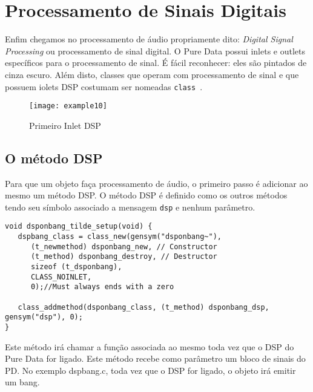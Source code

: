 
\chapter{Processamento de Sinais Digitais}

Enfim chegamos no processamento de áudio propriamente dito: \emph{Digital
Signal Processing} ou processamento de sinal digital.
O Pure Data possui inlets e outlets específicos para o processamento de sinal.
É fácil reconhecer: eles são pintados de cinza escuro.
Além disto, classes que operam com processamento de sinal e que possuem iolets
DSP costumam ser nomeadas \texttt{class~}.

\begin{figure}[h!]
\centering
\texttt{[image: example10]}
\caption{Primeiro Inlet DSP}
\end{figure}

\section{O método DSP}

Para que um objeto faça processamento de áudio, o primeiro passo é adicionar ao
mesmo um método DSP.
O método DSP é definido como os outros métodos tendo seu símbolo associado a
mensagem \texttt{dsp} e nenhum parâmetro.

\begin{lstlisting}[caption=Adicionando um método para DSP]
void dsponbang_tilde_setup(void) {
   dspbang_class = class_new(gensym("dsponbang~"),
      (t_newmethod) dsponbang_new, // Constructor
      (t_method) dsponbang_destroy, // Destructor
      sizeof (t_dsponbang),
      CLASS_NOINLET,
      0);//Must always ends with a zero

   class_addmethod(dsponbang_class, (t_method) dsponbang_dsp, gensym("dsp"), 0);
}
\end{lstlisting}

Este método irá chamar a função associada ao mesmo toda vez que o DSP do Pure
Data for ligado.
Este método recebe como parâmetro um bloco de sinais do PD.
No exemplo dspbang.c, toda vez que o DSP for ligado, o objeto irá emitir um bang.

